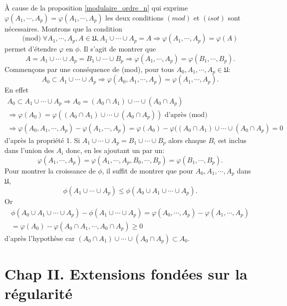 \begin{demo}
  À cause de la proposition \ref{modulaire_ordre_n} qui exprime $\varphi(A_1, \cdots, A_p) = \varphi(A_1,\cdots,A_p)$ les deux conditions $(mod)$ et $(isot)$ sont nécessaires.\newline
  Montrons que la condition 
  \begin{displaymath}
    \text{(mod)} \; \forall A_1, \cdots,A_p,A \in \mathfrak{U}, A_1 \cup \cdots \cup A_p = A \Rightarrow
    \varphi(A_1, \cdots,A_p) = \varphi(A)
  \end{displaymath}
  permet d'étendre $\varphi$ en $\phi$. Il s'agit de montrer que 
  \begin{displaymath}
    A = A_1 \cup \cdots \cup A_p = B_1 \cup \cdots \cup B_p \Rightarrow \varphi(A_1, \cdots, A_p) = \varphi(B_1, \cdots, B_p).
  \end{displaymath}
  Commençons par une conséquence de (mod), pour tous $A_0, A_1, \cdots, A_p \in \mathfrak{U}$:
  \begin{displaymath}
    A_0 \subset A_1 \cup \cdots \cup A_p \Rightarrow \varphi(A_0,A_1, \cdots, A_p) = \varphi(A_1, \cdots, A_p).
  \end{displaymath}
  En effet 
  \begin{align*}
    A_0 \subset A_1 \cup \cdots \cup A_p \Rightarrow A_0 = (A_0\cap A_1) \cup \cdots \cup (A_0 \cap A_p) \\
      \Rightarrow \varphi(A_0) = \varphi((A_0\cap A_1) \cup \cdots \cup (A_0 \cap A_p)) \text{ d'après (mod)} \\
      \Rightarrow \varphi(A_0,A_1, \cdots, A_p) - \varphi(A_1, \cdots, A_p) = \varphi(A_0) - \varphi((A_0\cap A_1) \cup \cdots \cup (A_0 \cap A_p) = 0
  \end{align*}
  d'après la propriété 1. Si $A_1 \cup \cdots \cup A_p = B_1 \cup \cdots \cup B_p$ alors chaque $B_i$ est inclus dans l'union des $A_i$ donc, en les ajoutant un par un:
  \begin{displaymath}
    \varphi(A_1, \cdots, A_p) = \varphi(A_1, \cdots, A_p, B_0, \cdots, B_p) = \varphi(B_1, \cdots, B_p).
  \end{displaymath}
  Pour montrer la croissance de $\phi$, il suffit de montrer que pour $A_0, A_1, \cdots, A_p$ dans $\mathfrak{U}$,
  \begin{displaymath}
    \phi(A_1\cup \cdots \cup A_p) \leq \phi(A_0 \cup A_1 \cup \cdots \cup A_p).
  \end{displaymath}
  Or 
  \begin{align*}
    \phi(A_0 \cup A_1 \cup \cdots \cup A_p) - \phi(A_1\cup \cdots \cup A_p) 
    = \varphi(A_0, \cdots, A_p) - \varphi(A_1, \cdots, A_p)\\
    = \varphi(A_0) - \varphi(A_0\cap A_1, \cdots, A_0\cap A_p) \geq 0
  \end{align*}
d'après l'hypothèse car $(A_0 \cap A_1) \cup \cdots \cup (A_0\cap A_p) \subset A_0$.
\end{demo}

\section{Chap II. Extensions fondées sur la régularité}



